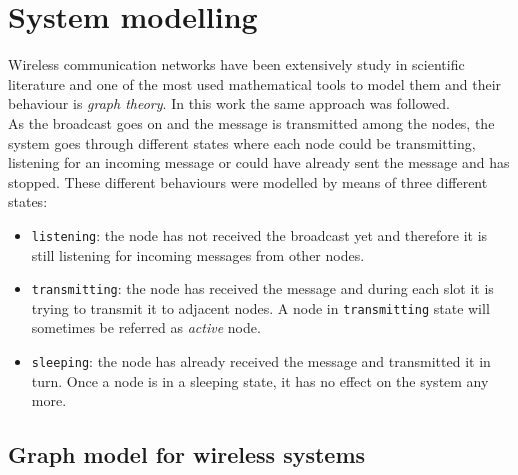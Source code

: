 \chapter{System modelling}\label{modelling}
Wireless communication networks have been extensively study in scientific literature and one of the most used mathematical tools to model them and their behaviour is \textit{graph theory}.
In this work the same approach was followed.\\
As the broadcast goes on and the message is transmitted among the nodes, the system goes through different states where each node could be transmitting, listening for an incoming message or could have already sent the message and has stopped.
These different behaviours were modelled by means of three different states:
\begin{itemize}
	\item
	\texttt{listening}: the node has not received the broadcast yet and therefore it is still listening for incoming messages from other nodes.
	\item
	\texttt{transmitting}: the node has received the message and during each slot it is trying to transmit it to adjacent nodes. A node in \texttt{transmitting} state will sometimes be referred as \textit{active} node.
	\item
	\texttt{sleeping}: the node has already received the message and transmitted it in turn. Once a node is in a sleeping state, it has no effect on the system any more.
\end{itemize}


\section{Graph model for wireless systems}

